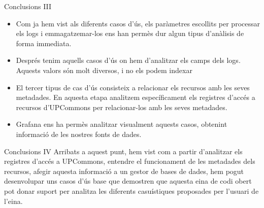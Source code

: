 \begin{frame}{Conclusions III}

    \begin{itemize}
        \item Com ja hem vist als diferents casos d’ús, els paràmetres escollits per processar els logs i emmagatzemar-los ens han permès dur algun tipus d’anàlisis de forma immediata.
        \item Després tenim aquells casos d’ús on hem d’analitzar els camps dels logs.
        Aquests valors són molt diversos, i no els podem indexar
        \item El tercer tipus de cas d’ús consisteix a relacionar els recursos amb les seves metadades.
        En aquesta etapa analitzem específicament els registres d’accés a recursos d’UPCommons per relacionar-los amb les seves metadades.
        \item Grafana ens ha permès analitzar visualment aquests casos, obtenint informació de les nostres fonts de dades.
    \end{itemize}

\end{frame}

\begin{frame}{Conclusions IV}
    Arribats a aquest punt, hem vist com a partir d’analitzar els registres d’accés a UPCommons, entendre el funcionament de les metadades dels recursos, afegir aquesta informació a un gestor de bases de dades, hem pogut desenvolupar uns casos d’ús base que demostren que aquesta eina de codi obert pot donar suport per analitza les diferents casuístiques proposades per l’usuari de l’eina.
\end{frame}